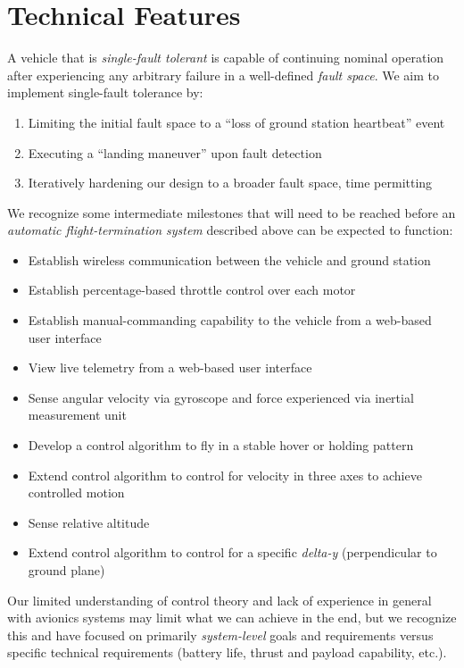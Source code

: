 \documentclass{article}
\begin{document}
\section{Technical Features}

A vehicle that is \textit{single-fault tolerant} is capable of continuing
nominal operation after experiencing any arbitrary failure in a well-defined
\textit{fault space}. We aim to implement single-fault tolerance by:

\begin{enumerate}
	\item Limiting the initial fault space to a ``loss of ground station
		heartbeat'' event
	\item Executing a ``landing maneuver'' upon fault detection
	\item Iteratively hardening our design to a broader fault space,
		time permitting
\end{enumerate}

\noindent We recognize some intermediate milestones that will need to be reached
before an \textit{automatic flight-termination system} described above can be
expected to function:

\begin{itemize}
	\item Establish wireless communication between the vehicle and
		ground station
	\item Establish percentage-based throttle control over each motor
	\item Establish manual-commanding capability to the vehicle from a
		web-based user interface
	\item View live telemetry from a web-based user interface
	\item Sense angular velocity via gyroscope and force experienced via
		inertial measurement unit
	\item Develop a control algorithm to fly in a stable hover or
		holding pattern
	\item Extend control algorithm to control for velocity in three axes
		to achieve controlled motion
	\item Sense relative altitude
	\item Extend control algorithm to control for a specific \textit{delta-y}
		(perpendicular to ground plane) 
\end{itemize}

\noindent Our limited understanding of control theory and lack of experience in
general with avionics systems may limit what we can achieve in the end, but we
recognize this and have focused on primarily \textit{system-level} goals and
requirements versus specific technical requirements (battery life, thrust and
payload capability, etc.).
\end{document}
